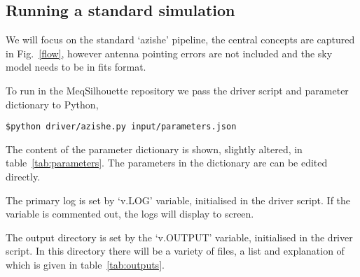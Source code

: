 \subsection{Running a standard simulation}

We will focus on the standard `azishe' pipeline, the central concepts are captured in Fig.~\ref{flow}, however antenna pointing errors are not included and the sky model needs to be in {\sc fits} format. 

To run in the MeqSilhouette repository we pass the driver script and parameter dictionary to {\sc Python},
\begin{verbatim}
$python driver/azishe.py input/parameters.json
\end{verbatim}


The content of the parameter dictionary is shown, slightly altered, in table~\ref{tab:parameters}. The parameters in the dictionary are can be edited directly. 

The primary log is set by `v.LOG' variable, initialised in the driver script. If the variable is commented out, the logs will display to screen. 

The output directory is set by the `v.OUTPUT' variable, initialised in the driver script. In this directory there will be a variety of files, a list and explanation of which is given in table~\ref{tab:outputs}.


